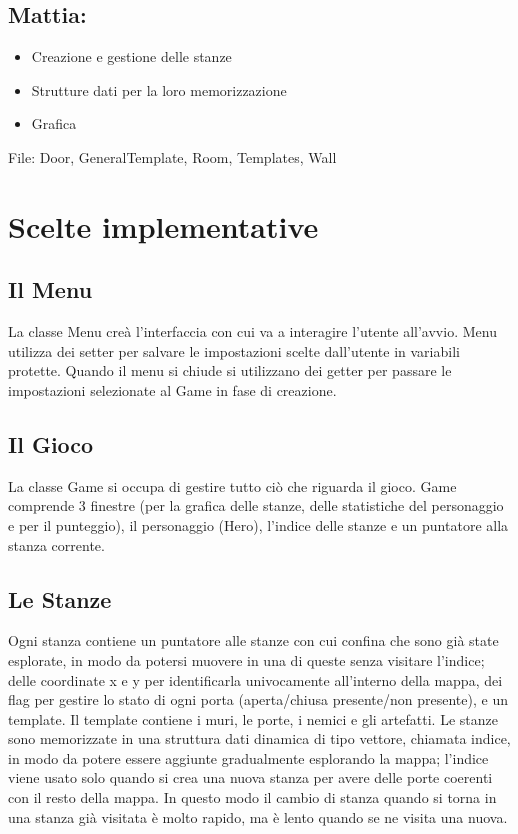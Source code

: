 \documentclass[12pt]{article}
\begin{document}
\subsection*{Mattia:}
\begin{itemize}
    \item Creazione e gestione delle stanze 
    \item Strutture dati per la loro memorizzazione
    \item Grafica
\end{itemize}
File: Door, GeneralTemplate, Room, Templates, Wall

\newpage
\section{Scelte implementative}
\subsection{Il Menu}
La classe Menu creà l'interfaccia con cui va a interagire l'utente all'avvio. Menu utilizza dei setter per salvare le impostazioni
scelte dall'utente in variabili protette. Quando il menu si chiude si utilizzano dei getter per passare le impostazioni selezionate
al Game in fase di creazione.

\subsection{Il Gioco}
La classe Game si occupa di gestire tutto ciò che riguarda il gioco.
Game comprende 3 finestre (per la grafica delle stanze, delle statistiche del personaggio e per il punteggio), 
il personaggio (Hero), l'indice delle stanze e un puntatore alla stanza corrente.

\subsection{Le Stanze}
Ogni stanza contiene un puntatore alle stanze con cui confina che sono già state esplorate, in modo da potersi muovere in una 
di queste senza visitare l'indice; delle coordinate x e y per identificarla univocamente all'interno della mappa, dei flag per
 gestire lo stato di ogni porta (aperta/chiusa presente/non presente), e un template. Il template contiene i muri, le porte, 
 i nemici e gli artefatti. \hfill\break
Le stanze sono memorizzate in una struttura dati dinamica di tipo vettore, chiamata indice, in modo da potere essere aggiunte gradualmente 
esplorando la mappa; l'indice viene usato solo quando si crea una nuova stanza per avere delle porte coerenti con il resto della mappa.
In questo modo il cambio di stanza quando si torna in una stanza già visitata è molto rapido, ma è lento quando se ne visita una nuova. 
\end{document}
